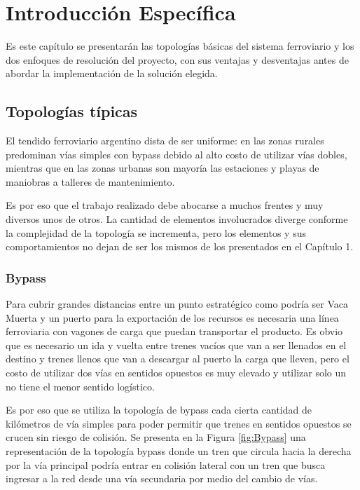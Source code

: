 \chapter{Introducción Específica} %

\label{Chapter2}

Es este capítulo se presentarán las topologías básicas del sistema ferroviario y los dos enfoques de resolución del proyecto, con sus ventajas y desventajas antes de abordar la implementación de la solución elegida.

\section{Topologías típicas}
	
	El tendido ferroviario argentino dista de ser uniforme: en las zonas rurales predominan vías simples con bypass debido al alto costo de utilizar vías dobles, mientras que en las zonas urbanas son mayoría las estaciones y playas de maniobras a talleres de mantenimiento.
	
	Es por eso que el trabajo realizado debe abocarse a muchos frentes y muy diversos unos de otros. La cantidad de elementos involucrados diverge conforme la complejidad de la topología se incrementa, pero los elementos y sus comportamientos no dejan de ser los mismos de los presentados en el Capítulo 1.

	\subsection{Bypass}

		Para cubrir grandes distancias entre un punto estratégico como podría ser Vaca Muerta y un puerto para la exportación de los recursos es necesaria una línea ferroviaria con vagones de carga que puedan transportar el producto. Es obvio que es necesario un ida y vuelta entre trenes vacíos que van a ser llenados en el destino y trenes llenos que van a descargar al puerto la carga que lleven, pero el costo de utilizar dos vías en sentidos opuestos es muy elevado y utilizar solo un no tiene el menor sentido logístico.
		
		Es por eso que se utiliza la topología de bypass cada cierta cantidad de kilómetros de vía simples para poder permitir que trenes en sentidos opuestos se crucen sin riesgo de colisión. Se presenta en la Figura \ref{fig:Bypass} una representación de la topología bypass donde un tren que circula hacia la derecha por la vía principal podría entrar en colisión lateral con un tren que busca ingresar a la red desde una vía secundaria por medio del cambio de vías.
		

